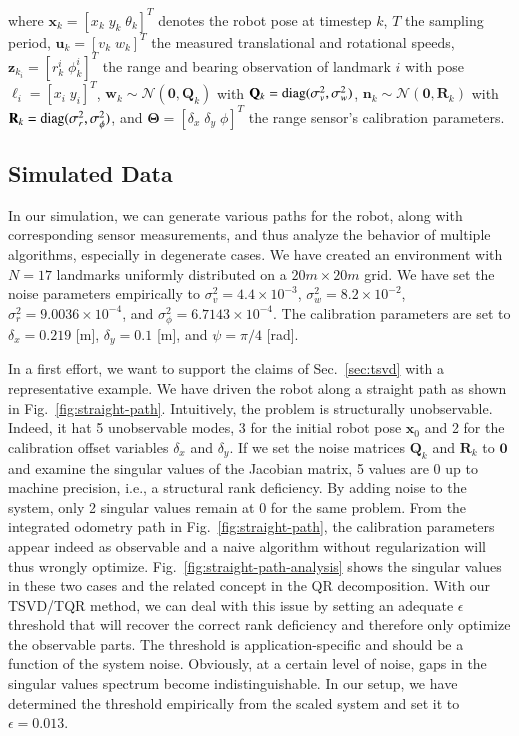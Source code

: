 \noindent where $\mathbf{x}_k=[x_k\;y_k\;\theta_k]^T$ denotes the robot pose at
timestep $k$, $T$ the sampling period, $\mathbf{u}_k=[v_k\;w_k]^T$ the measured
translational and rotational speeds, $\mathbf{z}_{k_i}=[r_k^i\;\phi_k^i]^T$ the
range and bearing observation of landmark $i$ with pose
$\boldsymbol{\ell}_i=[x_i\;y_i]^T$, $\mathbf{w}_k\sim\mathcal{N}(\mathbf{0},
\mathbf{Q}_k)$ with $\mathbf{Q}_k=\operatorname{diag}(\sigma^2_v,\sigma^2_w)$,
$\mathbf{n}_k\sim\mathcal{N}(\mathbf{0}, \mathbf{R}_k)$ with
$\mathbf{R}_k=\operatorname{diag}(\sigma^2_r,\sigma^2_\phi)$, and
$\mathbf{\Theta}=[\delta_x\;\delta_y\;\phi]^T$ the range sensor's calibration
parameters.

\subsection{Simulated Data}

In our simulation, we can generate various paths for the robot, along with
corresponding sensor measurements, and thus analyze the behavior of multiple
algorithms, especially in degenerate cases. We have created an environment
with $N=17$ landmarks uniformly distributed on a $20m\times 20m$ grid. We have
set the noise parameters empirically to $\sigma^2_v=4.4\times 10^{-3}$,
$\sigma^2_w=8.2\times 10^{-2}$, $\sigma^2_r=9.0036\times 10^{-4}$, and
$\sigma^2_\phi=6.7143\times 10^{-4}$. The calibration parameters are set to
$\delta_x=0.219$ [m], $\delta_y=0.1$ [m], and $\psi=\pi/4$ [rad].

In a first effort, we want to support the claims of Sec.~\ref{sec:tsvd} with
a representative example. We have driven the robot along a straight
path as shown in Fig.~\ref{fig:straight-path}. Intuitively, the problem is
structurally unobservable. Indeed, it hat 5 unobservable modes, 3 for the
initial robot pose $\mathbf{x}_0$ and 2 for the calibration offset variables
$\delta_x$ and $\delta_y$. If we set the noise matrices $\mathbf{Q}_k$ and
$\mathbf{R}_k$ to $\mathbf{0}$ and examine the singular values of the Jacobian
matrix, 5 values are $0$ up to machine precision, i.e., a structural rank
deficiency. By adding noise to the system, only 2 singular values remain at $0$
for the same problem. From the integrated odometry path in
Fig.~\ref{fig:straight-path}, the calibration parameters appear indeed as
observable and a naive algorithm without regularization will thus wrongly
optimize. Fig.~\ref{fig:straight-path-analysis} shows the singular values in
these two cases and the related concept in the QR decomposition. With our
TSVD/TQR method, we can deal with this issue by setting an adequate $\epsilon$
threshold that will recover the correct rank deficiency and therefore only
optimize the observable parts. The threshold is application-specific and should
be a function of the system noise. Obviously, at a certain level of noise, gaps
in the singular values spectrum become indistinguishable. In our setup, we have
determined the threshold empirically from the scaled system and set it to
$\epsilon=0.013$.

